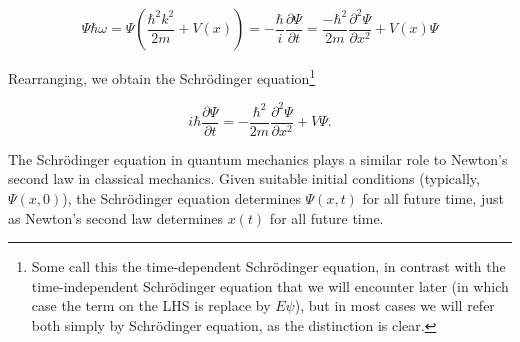 \documentclass[a4paper,12pt]{report}
\begin{document}
\begin{equation}
  \Psi \hbar\omega = \Psi \left(\frac{\hbar ^2 k^2 }{2m} + V(x)\right) = -\frac{\hbar }{i} \frac{\partial\Psi}{\partial t} = \frac{-\hbar ^2 }{2m} \frac{\partial^2\Psi }{\partial x^2} + V(x)\Psi \label{fma} 
\end{equation}

Rearranging, we obtain the Schrödinger equation\footnote{Some call this the time-dependent Schrödinger equation, in contrast with the time-independent Schrödinger equation that we will encounter later (in which case the term on the LHS is replace by \(E\psi \)), but in most cases we will refer both simply by Schrödinger equation, as the distinction is clear.} 

\begin{equation}
  i \hbar \frac{\partial \Psi}{\partial t}=-\frac{\hbar^2}{2 m} \frac{\partial^2 \Psi}{\partial x^2}+V \Psi .\label{scr}
\end{equation}

The Schrödinger equation in quantum mechanics plays a similar role to Newton's second law in classical mechanics. Given suitable initial conditions (typically, $\Psi(x, 0)$), the Schrödinger equation determines $\Psi(x, t)$ for all future time, just as Newton's second law determines $x(t)$ for all future time.
\end{document}
